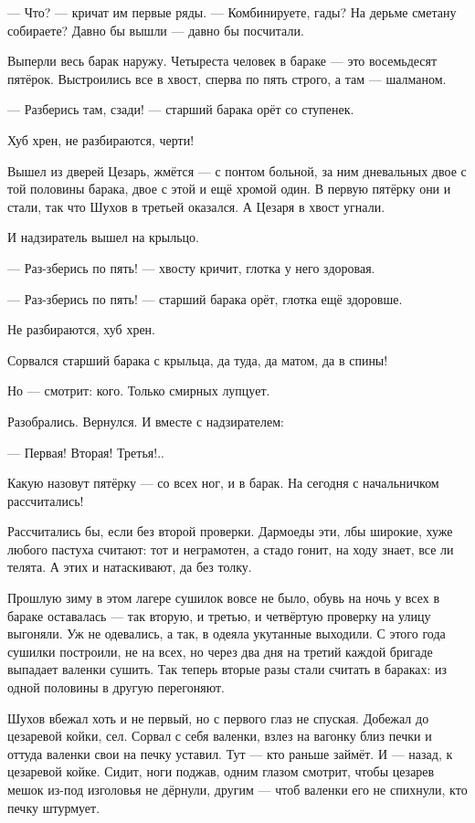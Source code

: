 --- Что? --- кричат им первые ряды. --- Комбинируете, гады? На дерьме сметану собираете? Давно бы
вышли --- давно бы посчитали.

Выперли весь барак наружу. Четыреста человек в бараке --- это восемьдесят пятёрок.
Выстроились все в хвост, сперва по пять строго, а там --- шалманом.

--- Разберись там, сзади! --- старший барака орёт со ступенек.

Хуб хрен, не разбираются, черти!

Вышел из дверей Цезарь, жмётся --- с понтом больной, за ним дневальных двое с той половины
барака, двое с этой и ещё хромой один. В первую пятёрку они и стали, так что Шухов в третьей
оказался. А Цезаря в хвост угнали.

И надзиратель вышел на крыльцо.

--- Раз-зберись по пять! --- хвосту кричит, глотка у него здоровая.

--- Раз-зберись по пять! --- старший барака орёт, глотка ещё здоровше.

Не разбираются, хуб хрен.

Сорвался старший барака с крыльца, да туда, да матом, да в спины!

Но --- смотрит: кого. Только смирных лупцует.

Разобрались. Вернулся. И вместе с надзирателем:

--- Первая! Вторая! Третья!..

Какую назовут пятёрку --- со всех ног, и в барак. На сегодня с начальничком рассчитались!

Рассчитались бы, если без второй проверки. Дармоеды эти, лбы широкие, хуже любого пастуха
считают: тот и неграмотен, а стадо гонит, на ходу знает, все ли телята. А этих и натаскивают, да
без толку.

Прошлую зиму в этом лагере сушилок вовсе не было, обувь на ночь у всех в бараке оставалась ---
так вторую, и третью, и четвёртую проверку на улицу выгоняли. Уж не одевались, а так, в одеяла
укутанные выходили. С этого года сушилки построили, не на всех, но через два дня на третий
каждой бригаде выпадает валенки сушить. Так теперь вторые разы стали считать в бараках: из
одной половины в другую перегоняют.

Шухов вбежал хоть и не первый, но с первого глаз не спуская. Добежал до цезаревой койки, сел.
Сорвал с себя валенки, взлез на вагонку близ печки и оттуда валенки свои на печку уставил.
Тут --- кто раньше займёт. И --- назад, к цезаревой койке. Сидит, ноги поджав, одним глазом
смотрит, чтобы цезарев мешок из-под изголовья не дёрнули, другим --- чтоб валенки его не
спихнули, кто печку штурмует.

